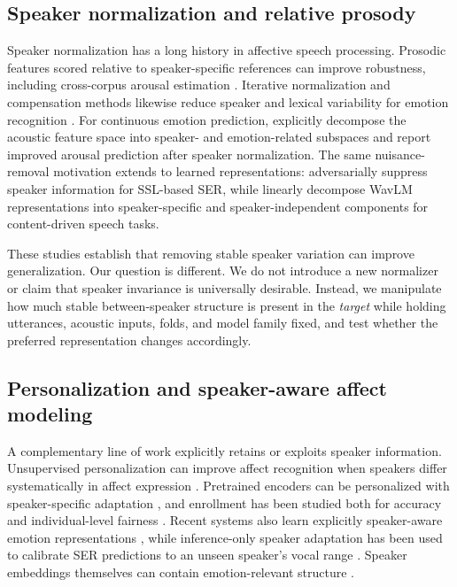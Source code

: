 \documentclass[11pt]{article}
\begin{document}
\subsection{Speaker normalization and relative prosody}

Speaker normalization has a long history in affective speech processing.
Prosodic features scored relative to speaker-specific references can improve robustness, including cross-corpus arousal estimation \citep{bone2012arousal,bone2014arousal}.
Iterative normalization and compensation methods likewise reduce speaker and lexical variability for emotion recognition \citep{busso2013normalization,mariooryad2014compensating}.
For continuous emotion prediction, \citet{dang2016factor} explicitly decompose the acoustic feature space into speaker- and emotion-related subspaces and report improved arousal prediction after speaker normalization.
The same nuisance-removal motivation extends to learned representations: \citet{gat2022speaker} adversarially suppress speaker information for SSL-based SER, while \citet{ruggiero2025eta} linearly decompose WavLM representations into speaker-specific and speaker-independent components for content-driven speech tasks.

These studies establish that removing stable speaker variation can improve generalization.
Our question is different.
We do not introduce a new normalizer or claim that speaker invariance is universally desirable.
Instead, we manipulate how much stable between-speaker structure is present in the \emph{target} while holding utterances, acoustic inputs, folds, and model family fixed, and test whether the preferred representation changes accordingly.

\subsection{Personalization and speaker-aware affect modeling}

A complementary line of work explicitly retains or exploits speaker information.
Unsupervised personalization can improve affect recognition when speakers differ systematically in affect expression \citep{sridhar2022personalization}.
Pretrained encoders can be personalized with speaker-specific adaptation \citep{tran2023personalized}, and enrollment has been studied both for accuracy and individual-level fairness \citep{triantafyllopoulos2024enrolment}.
Recent systems also learn explicitly speaker-aware emotion representations \citep{shi2025speaker}, while inference-only speaker adaptation has been used to calibrate SER predictions to an unseen speaker's vocal range \citep{lachut2025inference}.
Speaker embeddings themselves can contain emotion-relevant structure \citep{ulgen2024emotional}.
\end{document}

